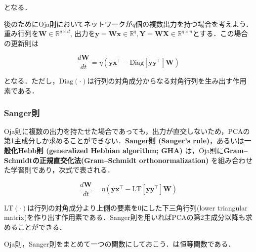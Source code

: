 となる．



後のためにOja則においてネットワークが$q$個の複数出力を持つ場合を考えよう．重み行列を$\mathbf{W} \in \mathbb{R}^{q\times d}$, 出力を$\mathbf{y}=\mathbf{W}\mathbf{x} \in \mathbb{R}^{q}, \mathbf{Y}=\mathbf{W}\mathbf{X} \in \mathbb{R}^{q\times n}$とする．この場合の更新則は


\begin{equation}
\frac{d\mathbf{W}}{dt} = \eta \left(\mathbf{y}\mathbf{x}^\top - \mathrm{Diag}\left[\mathbf{y}\mathbf{y}^\top\right] \mathbf{W}\right)
\end{equation}


となる．ただし，$\mathrm{Diag}(\cdot)$は行列の対角成分からなる対角行列を生み出す作用素である．
\subsubsection{Sanger則}
Oja則に複数の出力を持たせた場合であっても，出力が直交しないため，PCAの第1主成分しか求めることができない．\textbf{Sanger則 (Sanger's rule)}，あるいは\textbf{一般化Hebb則 (generalized Hebbian algorithm; GHA)} は，Oja則に\textbf{Gram–Schmidtの正規直交化法(Gram–Schmidt orthonormalization)} を組み合わせた学習則であり，次式で表される．


\begin{equation}
\frac{d\mathbf{W}}{dt} = \eta \left(\mathbf{y}\mathbf{x}^\top - \mathrm{LT}\left[\mathbf{y}\mathbf{y}^\top\right] \mathbf{W}\right)
\end{equation}


$\mathrm{LT}(\cdot)$は行列の対角成分より上側の要素を0にした下三角行列(lower triangular matrix)を作り出す作用素である．Sanger則を用いればPCAの第2主成分以降も求めることができる．



Oja則，Sanger則をまとめて一つの関数にしておこう．は恒等関数である．

